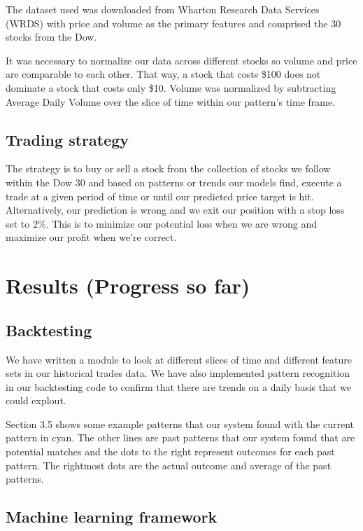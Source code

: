 \documentclass{article}
\begin{document}
The dataset used was downloaded from Wharton Research Data Services (WRDS) with price and volume as the primary features and comprised the 30 stocks from the Dow.

It was necessary to normalize our data across different stocks so volume and price are comparable to each other. That way, a stock that costs \$100 does not dominate a stock that costs only \$10. Volume was normalized by subtracting Average Daily Volume over the slice of time within our pattern's time frame.

\subsection{Trading strategy}

The strategy is to buy or sell a stock from the collection of stocks we follow within the Dow 30 and based on patterns or trends our models find, execute a trade  at a given period of time or until our predicted price target is hit. Alternatively, our prediction is wrong and we exit our position with a stop loss set to 2\%. This is to minimize our potential loss when we are wrong and maximize our profit when we're correct.

\section{Results (Progress so far)}

\subsection{Backtesting}

We have written a module to look at different slices of time and different feature sets in our historical trades data. We have also implemented pattern recognition in our backtesting code to confirm that there are trends on a daily basis that we could explout.

Section 3.5 shows some example patterns that our system found with the current pattern in cyan.   The other lines are past patterns that our system found that are potential matches and the dots to the right represent outcomes for each past pattern.  The rightmost dots are the actual outcome and average of the past patterns.

\subsection{Machine learning framework}
\end{document}
